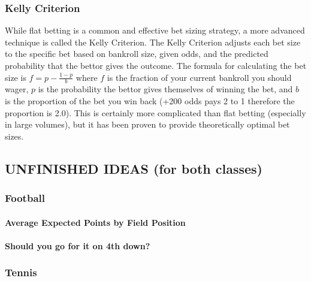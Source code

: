 \documentclass[]{article}
\let\oldparagraph\paragraph
\renewcommand{\paragraph}[1]{\oldparagraph{#1}\mbox{}}
\begin{document}
\hypertarget{kelly-criterion}{%
\subsubsection{Kelly Criterion}\label{kelly-criterion}}

While flat betting is a common and effective bet sizing strategy, a more
advanced technique is called the Kelly Criterion. The Kelly Criterion
adjusts each bet size to the specific bet based on bankroll size, given
odds, and the predicted probability that the bettor gives the outcome.
The formula for calculating the bet size is \(f=p-\frac{1-p}{b}\) where
\(f\) is the fraction of your current bankroll you should wager, \(p\)
is the probability the bettor gives themselves of winning the bet, and
\(b\) is the proportion of the bet you win back (+200 odds pays 2 to 1
therefore the proportion is 2.0). This is certainly more complicated
than flat betting (especially in large volumes), but it has been proven
to provide theoretically optimal bet sizes.

\hypertarget{unfinished-ideas-for-both-classes}{%
\subsection{UNFINISHED IDEAS (for both
classes)}\label{unfinished-ideas-for-both-classes}}

\hypertarget{football}{%
\subsubsection{Football}\label{football}}

\hypertarget{average-expected-points-by-field-position}{%
\paragraph{Average Expected Points by Field
Position}\label{average-expected-points-by-field-position}}

\hypertarget{should-you-go-for-it-on-4th-down}{%
\paragraph{Should you go for it on 4th
down?}\label{should-you-go-for-it-on-4th-down}}

\hypertarget{tennis-1}{%
\subsubsection{Tennis}\label{tennis-1}}
\end{document}
